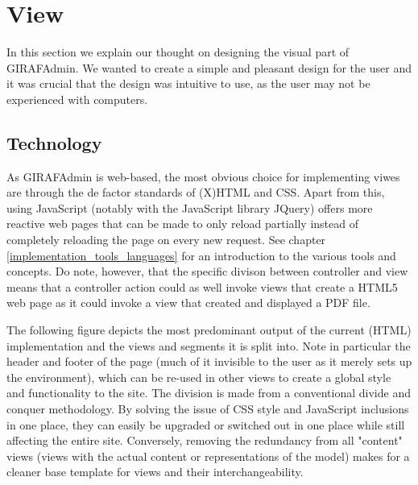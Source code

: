 \section{View}
\label{view}
In this section we explain our thought on designing the visual part of GIRAFAdmin. We wanted to create a simple and pleasant design for the user and it was crucial that the design was intuitive to use, as the user may not be experienced with computers. 

\subsection{Technology}
As GIRAFAdmin is web-based, the most obvious choice for implementing viwes are through the de factor standards of (X)HTML and CSS. Apart from this, using JavaScript (notably with the JavaScript library JQuery) offers more reactive web pages that can be made to only reload partially instead of completely reloading the page on every new request. See chapter \vref{implementation_tools_languages} for an introduction to the various tools and concepts. Do note, however, that the specific divison between controller and view means that a controller action could as well invoke views that create a HTML5 web page as it could invoke a view that created and displayed a PDF file.

The following figure depicts the most predominant output of the current (HTML) implementation and the views and segments it is split into. Note in particular the header and footer of the page (much of it invisible to the user as it merely sets up the environment), which can be re-used in other views to create a global style and functionality to the site. The division is made from a conventional divide and conquer methodology. By solving the issue of CSS style and JavaScript inclusions in one place, they can easily be upgraded or switched out in one place while still affecting the entire site. Conversely, removing the redundancy from all "content" views (views with the actual content or representations of the model) makes for a cleaner base template for views and their interchangeability.

